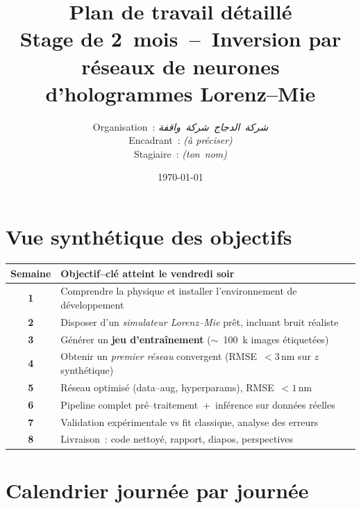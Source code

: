\documentclass[11pt,a4paper]{article}
\begin{document}
\title{Plan de travail détaillé\\\large Stage de 2 mois – Inversion par réseaux de neurones d'hologrammes Lorenz--Mie}
\author{\small Organisation : \emph{شركة الدجاج شركة واقفة}\\Encadrant : \emph{(à préciser)}\\Stagiaire : \emph{(ton nom)}}
\date{\today}
\maketitle

\tableofcontents
\bigskip

\section*{Vue synthétique des objectifs}

\begin{center}
\begin{tabularx}{\linewidth}{>{\bfseries}c X}
\toprule
Semaine & Objectif--clé atteint le vendredi soir \\
\midrule
1 & Comprendre la physique et installer l'environnement de développement \\
2 & Disposer d'un \emph{simulateur Lorenz--Mie} prêt, incluant bruit réaliste \\
3 & Générer un \textbf{jeu d'entraînement} (\(\sim\) 100 k images étiquetées) \\
4 & Obtenir un \emph{premier réseau} convergent (RMSE~$<3\,$nm sur $z$ synthétique) \\
5 & Réseau optimisé (data--aug, hyperparams), RMSE~$<1\,$nm \\
6 & Pipeline complet pré--traitement~+~inférence sur données réelles \\
7 & Validation expérimentale vs fit classique, analyse des erreurs \\
8 & Livraison : code nettoyé, rapport, diapos, perspectives \\
\bottomrule
\end{tabularx}
\end{center}

\bigskip

\section*{Calendrier journée par journée}
\end{document}
